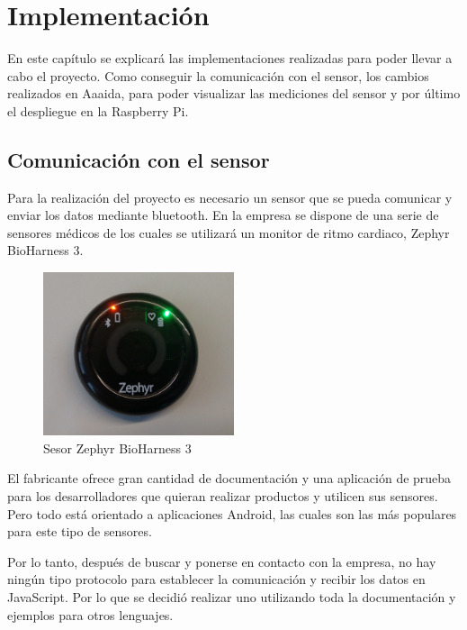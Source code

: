 \chapter{Implementación}

En este capítulo se explicará las implementaciones realizadas para poder llevar a cabo el proyecto. Como conseguir la comunicación con el sensor, los cambios realizados en Aaaida, para poder visualizar las mediciones del sensor y por último el despliegue en la Raspberry Pi. 

\section{Comunicación con el sensor}

Para la realización del proyecto es necesario un sensor que se pueda comunicar y enviar los datos mediante bluetooth. En la empresa se dispone de una serie de sensores médicos de los cuales se utilizará un monitor de ritmo cardiaco, Zephyr BioHarness 3. 

\begin{figure}[htb]
\begin{center}
\includegraphics[width=0.5\textwidth]{./setup/zephyr}
\caption{Sesor Zephyr BioHarness 3}
\end{center}
\end{figure}

El fabricante ofrece gran cantidad de documentación y una aplicación de prueba para los desarrolladores que quieran realizar productos y utilicen sus sensores. Pero todo está orientado a aplicaciones Android, las cuales son las más populares para este tipo de sensores. 

Por lo tanto, después de buscar y ponerse en contacto con la empresa, no hay ningún tipo protocolo para establecer la comunicación y recibir los datos en JavaScript. Por lo que se decidió realizar uno utilizando toda la documentación y ejemplos para otros lenguajes. 

